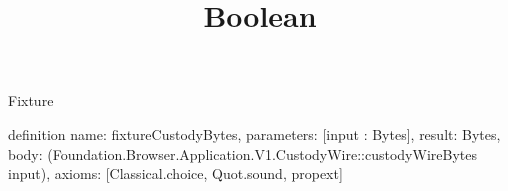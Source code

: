 \begin{lexlean}{Fixture}
\title{Boolean}
\begin{semanticmodule}
definition{
  name: fixtureCustodyBytes,
  parameters: [input : Bytes],
  result: Bytes,
  body: (Foundation.Browser.Application.V1.CustodyWire::custodyWireBytes input),
  axioms: [Classical.choice, Quot.sound, propext]
}
\end{semanticmodule}
\end{lexlean}
